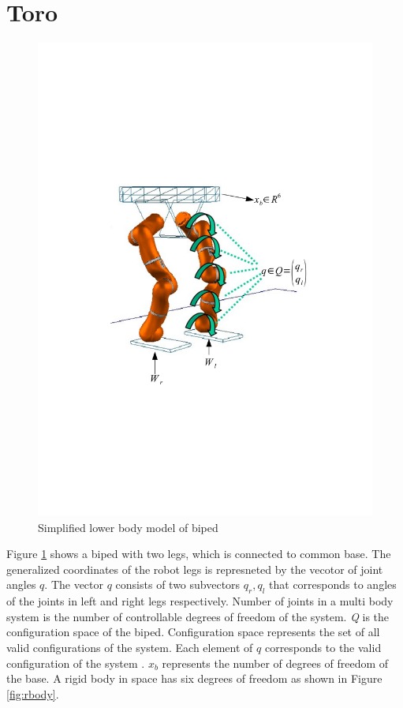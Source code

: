 \section{Toro}
\begin{figure}
\begin{center}
\includegraphics[trim= 10mm 80mm 10mm 80mm,scale=0.5]{Bilder/model_biped.pdf}
\caption{Simplified lower body model of biped}
\label{fig:biped_simplelow}
\end{center}
\end{figure}
Figure \ref{fig:biped_simplelow} shows a biped with two legs, which is connected to common base. The generalized coordinates of the robot legs is represneted by the vecotor of joint angles $q$. The vector $q$ consists of two subvectors $q_r,q_l$ that corresponds to angles of the joints in left and right legs respectively. Number of joints in a multi body system is the number of controllable degrees of freedom of the system. \emph{Q} is the configuration space of the biped. Configuration space represents the set of all valid configurations of the system. Each element of $q$ corresponds to the valid configuration of the system \cite[Chapter 2]{mur94}. $x_b$ represents the number of degrees of freedom of the base. A rigid body in space has six degrees of freedom as shown in Figure \ref{fig:rbody}.
